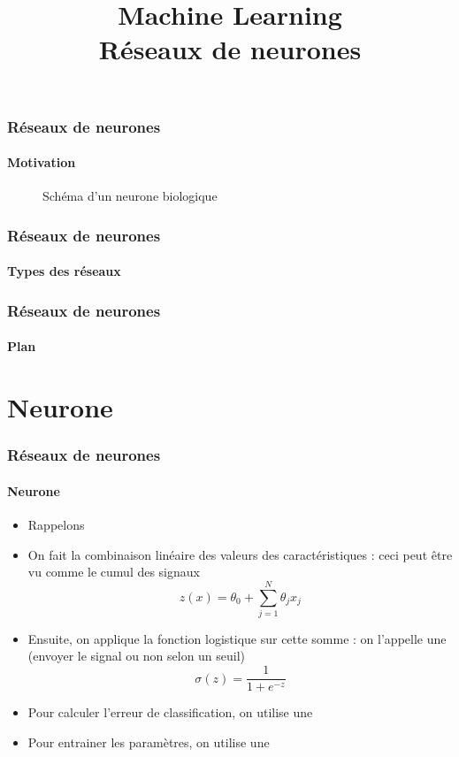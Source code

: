 \documentclass[xcolor=table]{beamer}
\title[ML: Réseaux de neurones] %
{Machine Learning \\Réseaux de neurones}
\begin{document}
\begin{frame}
\frametitle{Réseaux de neurones}
\framesubtitle{Motivation}

\begin{figure}
	\centering
	\caption{Schéma d'un neurone biologique \cite{2017-cain}}
\end{figure}

\end{frame}

\begin{frame}
	\frametitle{Réseaux de neurones}
	\framesubtitle{Types des réseaux}
	
	
\end{frame}

\begin{frame}
\frametitle{Réseaux de neurones}
\framesubtitle{Plan}

\begin{multicols}{2}
	\tableofcontents
\end{multicols}
\end{frame}

\section{Neurone}

\begin{frame}
\frametitle{Réseaux de neurones}
\framesubtitle{Neurone}

\begin{itemize}
	\item Rappelons 
	\item On fait la combinaison linéaire des valeurs des caractéristiques : ceci peut être vu comme le cumul des signaux
	\[z(x) = \theta_0 + \sum\limits_{j=1}^{N} \theta_j x_j\]
	\item Ensuite, on applique la fonction logistique sur cette somme : on l'appelle une  (envoyer le signal ou non selon un seuil) 
	\[\sigma(z) = \frac{1}{1 + e^{-z}}\] 
	\item Pour calculer l'erreur de classification, on utilise une 
	\item Pour entrainer les paramètres, on utilise une 
\end{itemize}

\end{frame}
\end{document}
